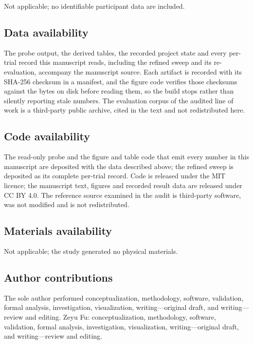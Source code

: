 Not applicable; no identifiable participant data are included.

\subsection*{Data availability}

The probe output, the derived tables, the recorded project state and every
per-trial record this manuscript reads, including the refined sweep and its
re-evaluation, accompany the manuscript source. Each artifact is recorded with
its SHA-256 checksum in a manifest, and the figure code verifies those checksums
against the bytes on disk before reading them, so the build stops rather than
silently reporting stale numbers. The evaluation corpus of the audited line of
work is a third-party public archive, cited in the text and not redistributed
here.


\subsection*{Code availability}

The read-only probe and the figure and table code that emit every number in
this manuscript are deposited with the data described above; the refined sweep
is deposited as its complete per-trial record. Code is released under the MIT
licence; the manuscript text, figures and recorded result data are released
under CC BY 4.0. The reference source examined in the audit is third-party
software, was not modified and is not redistributed.

\subsection*{Materials availability}

Not applicable; the study generated no physical materials.

\subsection*{Author contributions}

\ifdefined\ANONYMOUS
The sole author performed conceptualization, methodology, software, validation,
formal analysis, investigation, visualization, writing---original draft, and
writing---review and editing.
\else
Zeyu Fu: conceptualization, methodology, software, validation, formal analysis,
investigation, visualization, writing---original draft, and writing---review
and editing.
\fi

